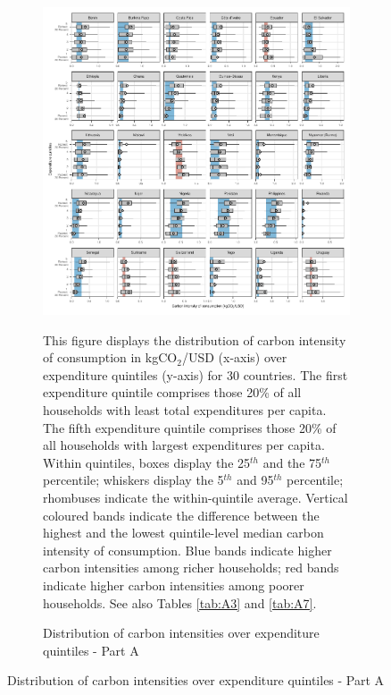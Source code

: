 \begin{figure}[ht!]
  \centering
  \caption{Distribution of carbon intensities over expenditure quintiles} \label{fig:Quint}
  \begin{subfigure}[b]{\textwidth}
  \centering
    \caption{Distribution of carbon intensities over expenditure quintiles - Part A} \label{fig:Quint_A}
  \includegraphics{1_Figures/Figures_Appendix/Figure_1_2017_Appendix_1}
  \begin{subcaption2}
    This figure displays the distribution of carbon intensity of consumption in kgCO$_{2}$/USD (x-axis) over expenditure quintiles (y-axis) for 30 countries. The first expenditure quintile comprises those 20\% of all households with least total expenditures per capita. The fifth expenditure quintile comprises those 20\% of all households with largest expenditures per capita. Within quintiles, boxes display the 25$^{th}$ and the 75$^{th}$ percentile; whiskers display the 5$^{th}$ and 95$^{th}$ percentile; rhombuses indicate the within-quintile average. Vertical coloured bands indicate the difference between the highest and the lowest quintile-level median carbon intensity of consumption. Blue bands indicate higher carbon intensities among richer households; red bands indicate higher carbon intensities among poorer households. See also Tables \ref{tab:A3} and \ref{tab:A7}.
  \end{subcaption2}
  \end{subfigure}
\end{figure}

